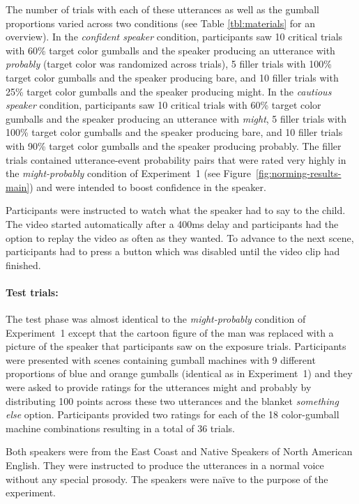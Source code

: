 \documentclass[man, floatsintext]{apa6}
\newcommand{\figref}[1]{Figure~\ref{#1}}
\begin{document}
The number of trials with each of these utterances as well as the gumball proportions varied across two conditions (see Table \ref{tbl:materials} for an overview). In the {\it confident speaker} condition, participants saw 10 critical trials with 60\% target color gumballs and the speaker producing an utterance with \emph{probably} (target color was randomized across trials), 5 filler trials with 100\% target color gumballs and the speaker producing {\sc bare}, and 10 filler trials with 25\% target color gumballs and the speaker producing {\sc might}. In the {\it cautious speaker} condition, participants saw 10 critical trials with 60\% target color gumballs and the speaker producing an utterance with \emph{might}, 5 filler trials with 100\% target color gumballs and the speaker producing {\sc bare}, and 10 filler trials with 90\% target color gumballs and the speaker producing {\sc probably}. The filler trials contained utterance-event probability pairs that were rated very highly in the \textit{might-probably} condition of Experiment~1 (see \figref{fig:norming-results-main}) and were intended to boost confidence in the speaker.

Participants were instructed to watch what the speaker had to say to the child. The video started automatically after a 400ms delay and participants had the option to replay the video as often as they wanted. To advance to the next scene, participants had to press a button which was disabled until the video clip had finished.

\paragraph{Test trials:} The test phase was almost identical to the  \textit{might-probably} condition of Experiment~1 except that the cartoon figure of the man was replaced with a picture of the speaker that participants saw on the exposure trials. Participants were presented with scenes containing gumball machines with 9 different proportions of blue and orange gumballs  (identical as in Experiment~1) and they were asked to provide ratings for the utterances {\sc might} and {\sc probably} by distributing 100 points across these two utterances and the blanket {\it something else} option. Participants provided two ratings for each of the 18 color-gumball machine combinations resulting in a total of 36 trials. 

Both speakers were from the East Coast and Native Speakers of North American English.
They were instructed to produce the utterances in a normal voice without any special prosody. The speakers were
na\"ive to the purpose of the experiment.
\end{document}
